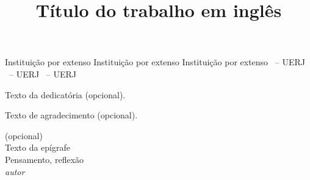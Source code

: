 \documentclass[a4paper,12pt,oneside,onecolumn,final,fleqn]{repUERJ}
\title{Título do trabalho em inglês}
\begin{document}

\frontmatter %

%
\capa
\folhaderosto
%
%
%
%
\fichacatalografica{}
%
%
\begin{folhadeaprovacao}
             {Instituição por extenso}
             {Instituição por extenso}
             {Instituição por extenso}
             {\UERJunidade \UERJunidadenome\ -- UERJ}
             {\UERJunidade \UERJunidadenome\ -- UERJ}
             {\UERJunidade \UERJunidadenome\ -- UERJ}
\end{folhadeaprovacao}
%
%
\vfill
Texto da dedicatória (opcional).
%
%

Texto de agradecimento (opcional).
%
%
\pretextualchapter{}
  \vfill
  \begin{flushright}
 (opcional)\\
 Texto da epígrafe\\
 Pensamento, reflexão\\    
    \textit{autor}
  \end{flushright}
%
%
\end{document}
